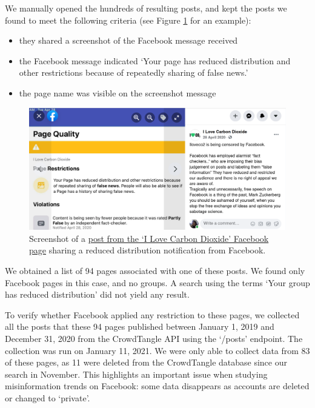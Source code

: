 \documentclass[11pt,a4paper]{article}
\begin{document}
We manually opened the hundreds of resulting posts, and kept the posts we found to meet the following criteria (see Figure \ref{reduce_example_screenshot} for an example):
\begin{itemize}
\item they shared a screenshot of the Facebook message received
\item the Facebook message indicated `Your page has reduced distribution and other restrictions because of repeatedly sharing of false news.'
\item the page name was visible on the screenshot message
\end{itemize}

\begin{figure}[!h]
\centering
\includegraphics[width=\linewidth]{./../figure/reduce_example_screenshot.png}
\caption{Screenshot of a \href{https://www.facebook.com/64162630683/posts/10156872415530684}{post from the `I Love Carbon Dioxide' Facebook page} sharing a reduced distribution notification from Facebook.}
\label{reduce_example_screenshot}
\end{figure}

We obtained a list of 94 pages associated with one of these posts. 
We found only Facebook pages in this case, and no groups. 
A search using the terms `Your group has reduced distribution' did not yield any result.

To verify whether Facebook applied any restriction to these pages, we collected all the posts that these 94 pages published between January 1, 2019 and December 31, 2020 from the CrowdTangle API using the `/posts' endpoint. 
The collection was run on January 11, 2021. 
We were only able to collect data from 83 of these pages, as 11 were deleted from the CrowdTangle database since our search in November. 
This highlights an important issue when studying misinformation trends on Facebook: some data disappears as accounts are deleted or changed to ‘private’.
\end{document}
